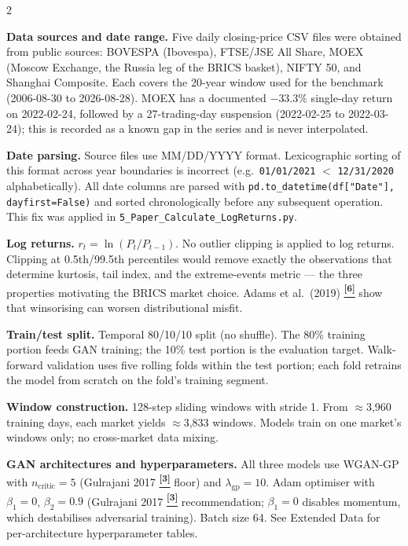 \documentclass[10pt]{article}
\newcommand{\tcite}[1]{%
  \hyperlink{R:#1}{\textsuperscript{\scriptsize\textbf{[#1]}}}}
\begin{document}
\begin{multicols}{2}
\small

\textbf{Data sources and date range.}
Five daily closing-price CSV files were obtained from public sources: BOVESPA (Ibovespa), FTSE/JSE All Share, MOEX (Moscow Exchange, the Russia leg of the BRICS basket), NIFTY 50, and Shanghai Composite. Each covers the 20-year window used for the benchmark (2006-08-30 to 2026-08-28). MOEX has a documented $-33.3\%$ single-day return on 2022-02-24, followed by a 27-trading-day suspension (2022-02-25 to 2022-03-24); this is recorded as a known gap in the series and is never interpolated.

\textbf{Date parsing.}
Source files use MM/DD/YYYY format. Lexicographic sorting of this format across year boundaries is incorrect (e.g.\ \texttt{01/01/2021} $<$ \texttt{12/31/2020} alphabetically). All date columns are parsed with \texttt{pd.to\_datetime(df["Date"], dayfirst=False)} and sorted chronologically before any subsequent operation. This fix was applied in \texttt{5\_Paper\_Calculate\_LogReturns.py}.

\textbf{Log returns.}
$r_t = \ln(P_t / P_{t-1})$. No outlier clipping is applied to log returns. Clipping at 0.5th/99.5th percentiles would remove exactly the observations that determine kurtosis, tail index, and the extreme-events metric --- the three properties motivating the BRICS market choice. Adams et al.\ (2019)\tcite{6} show that winsorising can worsen distributional misfit.

\textbf{Train/test split.}
Temporal 80/10/10 split (no shuffle). The 80\% training portion feeds GAN training; the 10\% test portion is the evaluation target. Walk-forward validation uses five rolling folds within the test portion; each fold retrains the model from scratch on the fold's training segment.

\textbf{Window construction.}
128-step sliding windows with stride 1. From $\approx$3{,}960 training days, each market yields $\approx$3{,}833 windows. Models train on one market's windows only; no cross-market data mixing.

\textbf{GAN architectures and hyperparameters.}
All three models use WGAN-GP with $n_\text{critic}=5$ (Gulrajani 2017\tcite{3} floor) and $\lambda_\text{gp}=10$. Adam optimiser with $\beta_1=0$, $\beta_2=0.9$ (Gulrajani 2017\tcite{3} recommendation; $\beta_1=0$ disables momentum, which destabilises adversarial training). Batch size 64. See Extended Data for per-architecture hyperparameter tables.


\end{multicols}
\end{document}
